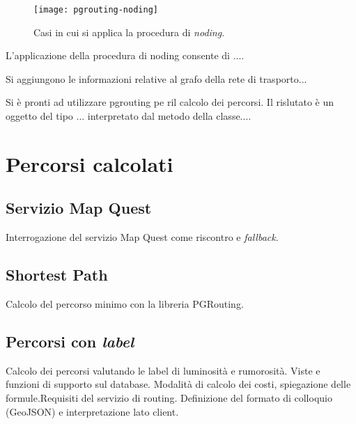 \begin{figure}[ht]
  \centering
  \texttt{[image: pgrouting-noding]}
  \caption{\footnotesize{Casi in cui si applica la procedura di \emph{noding}.}}
  \label{fig:pgrouting-noding}
\end{figure}

L'applicazione della procedura di noding consente di ....

Si aggiungono le informazioni relative al grafo della rete di trasporto... 

Si è pronti ad utilizzare pgrouting pe ril calcolo dei percorsi. Il rislutato è un oggetto del tipo ... interpretato dal metodo della classe....

\section{Percorsi calcolati}
\subsection{Servizio Map Quest}
Interrogazione del servizio Map Quest come riscontro e \emph{fallback}. 
\subsection{Shortest Path}
Calcolo del percorso minimo con la libreria PGRouting.
\subsection{Percorsi con \emph{label}}
Calcolo dei percorsi valutando le label di luminosità e rumorosità. Viste e funzioni di supporto sul database. Modalità di calcolo dei costi, spiegazione delle formule.Requisiti del servizio di routing. Definizione del formato di colloquio (GeoJSON) e interpretazione lato client.